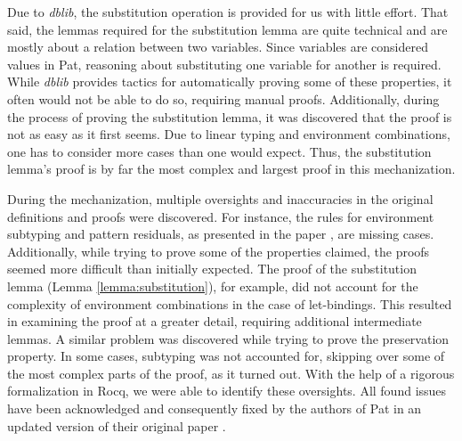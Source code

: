 Due to \emph{dblib}, the substitution operation is provided for us with little effort.
That said, the lemmas required for the substitution lemma are quite technical and are mostly about a relation between two variables.
Since variables are considered values in Pat, reasoning about substituting one variable for another is required.
While \emph{dblib} provides tactics for automatically proving some of these properties, it often would not be able to do so,
requiring manual proofs.
Additionally, during the process of proving the substitution lemma, it was discovered that the proof is not as easy as it first seems.
Due to linear typing and environment combinations, one has to consider more cases than one would expect.
Thus, the substitution lemma's proof is by far the most complex and largest proof in this mechanization.


During the mechanization, multiple oversights and inaccuracies in the original definitions and proofs were discovered.
For instance, the rules for environment subtyping and pattern residuals, as presented in the paper \cite{fowlerSpecialDeliveryProgramming2023}, are missing cases.
Additionally, while trying to prove some of the properties claimed, the proofs seemed more difficult than initially expected.
The proof of the substitution lemma (Lemma \ref{lemma:substitution}), for example, did not account for the complexity of environment combinations in the
case of let-bindings.
This resulted in examining the proof at a greater detail, requiring additional intermediate lemmas.
A similar problem was discovered while trying to prove the preservation property.
In some cases, subtyping was not accounted for, skipping over some of the most complex parts of the proof, as it turned out.
With the help of a rigorous formalization in Rocq, we were able to identify these oversights.
All found issues have been acknowledged and consequently fixed by the authors of Pat in an updated version of their original paper \cite{fowlerSpecialDeliveryProgramming2025}.
